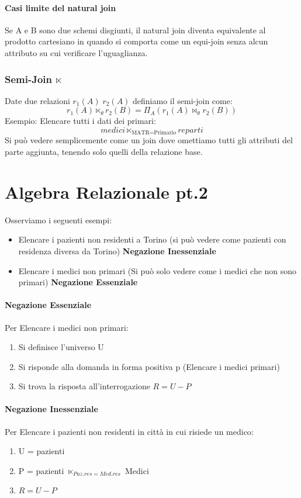 \documentclass[10pt,twocolumn]{article}
\begin{document}
\subsection{Casi limite del natural join}
Se A e B sono due schemi disgiunti, il natural join diventa equivalente al prodotto cartesiano in quando si comporta come un equi-join senza alcun attributo su cui verificare l'uguaglianza.
\section{Semi-Join $\ltimes$}
Date due relazioni $r_1(A) \; r_2(A)$ definiamo il semi-join come: \[r_1(A) \ltimes_\theta r_2(B) = \Pi_A (r_1(A) \bowtie_\theta r_2(B))\]
Esempio: Elencare tutti i dati dei primari: \[ medici \ltimes_{\text{MATR=Primario}} reparti\]
Si può vedere semplicemente come un join dove omettiamo tutti gli attributi del parte aggiunta, tenendo solo quelli della relazione base.
\clearpage
\part{Algebra Relazionale pt.2}
Osserviamo i seguenti esempi:
\begin{itemize}
    \item Elencare i pazienti non residenti a Torino (si può vedere come pazienti con residenza diversa da Torino) \textbf{Negazione Inessenziale}
    \item Elencare i medici non primari (Si può solo vedere come i medici che non sono primari) \textbf{Negazione Essenziale}
\end{itemize}
\subsection{Negazione Essenziale}
Per Elencare i medici non primari:
\begin{enumerate}
    \item Si definisce l'universo U
    \item Si risponde alla domanda in forma positiva p (Elencare i medici primari)
    \item Si trova la risposta all'interrogazione \newline $R = U - P$
\end{enumerate}
\subsection{Negazione Inessenziale}
Per Elencare i pazienti non residenti in città in cui risiede un medico:
\begin{enumerate}
    \item U = pazienti
    \item P = pazienti $\ltimes_{Paz.res = Med.res}$  Medici
    \item $R = U - P$
\end{enumerate}
\end{document}
